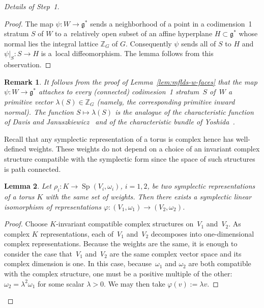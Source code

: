 \documentclass[pdftex]{sigma}
\numberwithin{equation}{section}
\newtheorem{Lemma}{Lemma}[section]
\newtheorem{Remark}[Lemma]{Remark}
\begin{document}
\begin{proof}[Details of Step~1]
\begin{proof}
  The map $\psi\colon W\to {\mathfrak g}^*$  sends a
  neighborhood of a point in a codimension~1 stratum $S$ of $W$ to a~relatively open subset of an af\/f\/ine hyperplane $H\subset {\mathfrak g}^*$
  whose normal lies the integral lattice ${\mathbb Z}_G$ of $G$.  Consequently
  $\psi$ sends all of $S$ to $H$ and $\psi|_S\colon S\to H$ is a~local dif\/feomorphism.  The lemma follows from this observation.
\end{proof}

\begin{Remark}
  It follows from the proof of Lemma~\ref{lem:mflds-w-faces} that the
  map $\psi\colon W\to {\mathfrak g}^*$ attaches to every (connected) codimesion~1
  stratum~$S$ of~$W$ a primitive vector $\lambda(S)\in {\mathbb Z}_G$
  (namely, the corresponding primitive inward normal).
  The function $S\mapsto \lambda(S)$ is the
  analogue of the characteristic function of Davis and Januszkiewicz~\cite{DJ} and of the characteristic bundle of Yoshida~\cite{Y}.
\end{Remark}

Recall that any symplectic representation of a torus is complex hence
has well-def\/ined weights.  These weights do not depend on a choice of
an invariant complex structure compatible with the symplectic form
since the space of such structures is path connected.

\begin{Lemma}\label{lemma:step1.2}
  Let $\rho_i\colon K\to \operatorname{Sp}(V_i,\omega_i)$, $i=1,2$, be two symplectic
  representations of a torus $K$ with the same set of weights.
  Then there exists a symplectic linear isomorphism of representations
  $\varphi\colon  (V_1,\omega_1) \to (V_2,\omega_2)$.
\end{Lemma}

\begin{proof}
  Choose $K$-invariant compatible complex structures on~$V_1$ and~$V_2$.
  As complex $K$ representations, each of~$V_1$ and~$V_2$
  decomposes into one-dimensional complex representations.
  Because the weights are the same, it is enough to consider the case
  that~$V_1$ and~$V_2$ are the same complex vector space
  and its complex dimension is one.
  In this case, because~$\omega_1$ and $\omega_2$ are both compatible
  with the complex structure, one must be a positive multiple of the other:
  $\omega_2 = \lambda^2 \omega_1$ for some scalar $\lambda >0$.
  We may then take $\varphi(v) := \lambda v$.
\end{proof}


\end{proof}
\end{document}
